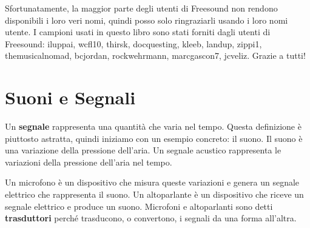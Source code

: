 \documentclass[12pt,a4paper]{book}
\begin{document}
Sfortunatamente, la maggior parte degli utenti di Freesound non rendono disponibili i loro veri nomi, quindi posso solo ringraziarli usando i loro nomi utente. I campioni usati in questo libro sono stati forniti dagli utenti di Freesound: iluppai, wcfl10, thirsk, docquesting, kleeb, landup, zippi1, themusicalnomad, bcjordan, rockwehrmann, marcgascon7, jcveliz. Grazie a tutti!

\normalsize

\clearemptydoublepage

\begin{latexonly} 

\tableofcontents

\clearemptydoublepage

\end{latexonly} 

\mainmatter

\chapter{Suoni e Segnali} \label{sounds} 

Un {\bf segnale} rappresenta una quantità che varia nel tempo. Questa definizione è piuttosto astratta, quindi iniziamo con un esempio concreto: il suono. Il suono è una variazione della pressione dell'aria. Un segnale acustico rappresenta le variazioni della pressione dell'aria nel tempo.

Un microfono è un dispositivo che misura queste variazioni e genera un segnale elettrico che rappresenta il suono. Un altoparlante è un dispositivo che riceve un segnale elettrico e produce un suono. Microfoni e altoparlanti sono detti {\bf trasduttori} perché trasducono, o convertono, i segnali da una forma all'altra.
\end{document}
